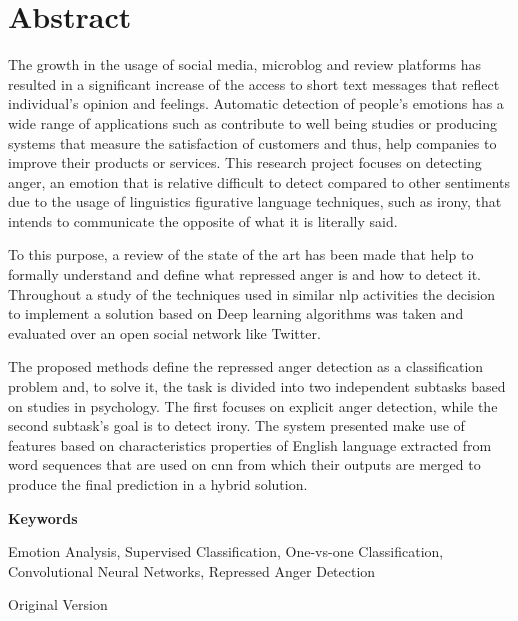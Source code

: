 \chapter*{Abstract}

The growth in the usage of social media, microblog and review platforms has resulted in a significant increase of the access to short text messages that reflect individual's opinion and feelings. Automatic detection of people's emotions has a wide range of applications such as contribute to well being studies or producing systems that measure the satisfaction of customers and thus, help companies to improve their products or services. This research project focuses on detecting anger, an emotion that is relative difficult to detect compared to other sentiments due to the usage of linguistics figurative language techniques, such as irony, that intends to communicate the opposite of what it is literally said.

To this purpose, a review of the state of the art has been made that help to formally understand and define what repressed anger is and how to detect it. Throughout a study of the techniques used in similar \acrshort{nlp} activities the decision to implement a solution based on Deep learning algorithms was taken and evaluated over an open social network like Twitter.

The proposed methods define the repressed anger detection as a classification problem and, to solve it, the task is divided into two independent subtasks based on studies in psychology. The first focuses on explicit anger detection, while the second subtask's goal is to detect irony. The system presented make use of features based on characteristics properties of English language extracted from word sequences that are used on \acrlong{cnn} from which their outputs are merged to produce the final prediction in a hybrid solution.

\vspace{2em}

{\Large\bfseries\sffamily Keywords}
\vspace{3\medskipamount}

Emotion Analysis, Supervised Classification, One-vs-one Classification, Convolutional Neural Networks, Repressed Anger Detection

\iffalse

Original Version

